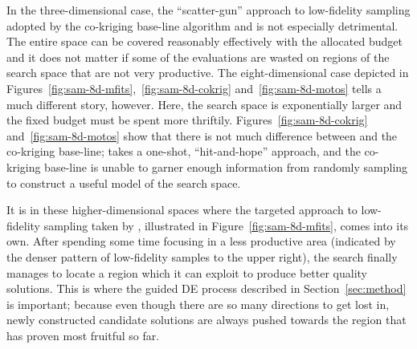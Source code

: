 In the three-dimensional case, the ``scatter-gun'' approach to low-fidelity sampling adopted by the co-kriging base-line algorithm and \motos{} is not especially detrimental. The entire space can be covered reasonably effectively with the allocated budget and it does not matter if some of the evaluations are wasted on regions of the search space that are not very productive. The eight-dimensional case depicted in Figures~\ref{fig:sam-8d-mfits},~\ref{fig:sam-8d-cokrig} and~\ref{fig:sam-8d-motos} tells a much different story, however. Here, the search space is exponentially larger and the fixed budget must be spent more thriftily. Figures~\ref{fig:sam-8d-cokrig} and~\ref{fig:sam-8d-motos} show that there is not much difference between \motos{} and the co-kriging base-line; \motos{} takes a one-shot, ``hit-and-hope'' approach, and the co-kriging base-line is unable to garner enough information from randomly sampling to construct a useful model of the search space. 

It is in these higher-dimensional spaces where the targeted approach to low-fidelity sampling taken by \AlgName{}, illustrated in Figure~\ref{fig:sam-8d-mfits}, comes into its own. After spending some time focusing in a less productive area (indicated by the denser pattern of low-fidelity samples to the upper right), the search finally manages to locate a region which it can exploit to produce better quality solutions. This is where the guided DE process described in Section~\ref{sec:method} is important; because even though there are so many directions to get lost in, newly constructed candidate solutions are always pushed towards the region that has proven most fruitful so far.

